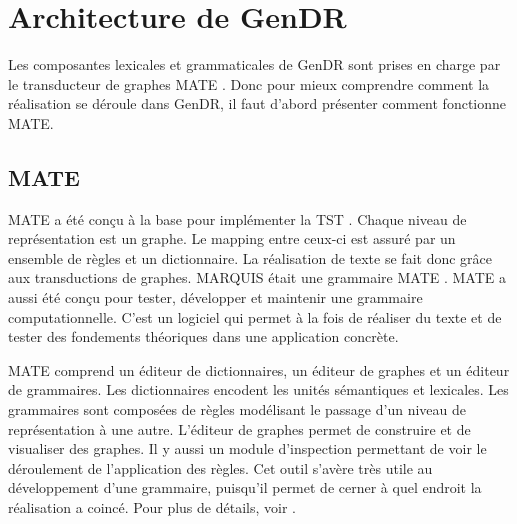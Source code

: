 
\section{Architecture de GenDR}

Les composantes lexicales et grammaticales de GenDR sont prises en charge par le transducteur de graphes MATE \citep{BohnetDevelopmentEnvironmentMTTbased2000}. Donc pour mieux comprendre comment la réalisation se déroule dans GenDR, il faut d'abord présenter comment fonctionne MATE.

\subsection{MATE}
MATE a été conçu à la base pour implémenter la \ac{TST} \cite{BohnetDevelopmentEnvironmentMTTbased2000}. Chaque niveau de représentation est un graphe. Le mapping entre ceux-ci est assuré par un ensemble de règles et un dictionnaire. La réalisation de texte se fait donc grâce aux transductions de graphes. MARQUIS était une grammaire MATE \citep{Lareau2007TowardsAG}. MATE a aussi été conçu pour tester, développer et maintenir une grammaire computationnelle. C'est un logiciel qui permet à la fois de réaliser du texte et de tester des fondements théoriques dans une application concrète.

MATE comprend un éditeur de dictionnaires, un éditeur de graphes et un éditeur de grammaires. Les dictionnaires encodent les unités sémantiques et lexicales. Les grammaires sont composées de règles modélisant le passage d'un niveau de représentation à une autre. L'éditeur de graphes permet de construire et de visualiser des graphes. Il y aussi un module d'inspection permettant de voir le déroulement de l'application des règles. Cet outil s'avère très utile au développement d'une grammaire, puisqu'il permet de cerner à quel endroit la réalisation a coincé. Pour plus de détails, voir \cite{BohnetOpensourcegraph2010,LambreyImplementationcollocationspour2017}.

